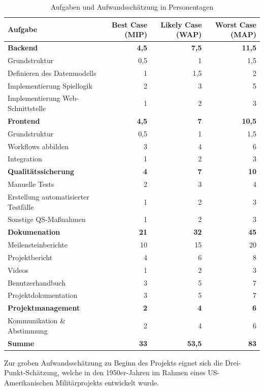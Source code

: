 \documentclass[a4paper,11pt,listof=numbered,glossary=totoc,parskip=half,toc=bib]{scrreprt}
\begin{document}
	\begin{table}
		\centering
		\begin{tabular}{lrrr}
			\toprule
			Aufgabe & Best Case (MIP) & Likely Case (WAP) & Worst Case (MAP) \\
			\midrule
			\textbf{Backend} & \textbf{4,5} & \textbf{7,5} & \textbf{11,5} \\
			Grundstruktur & 0,5 & 1 & 1,5 \\
			Definieren des Datenmodells & 1 & 1,5 & 2 \\
			Implementierung Spiellogik & 2 & 3 & 5 \\
			Implementierung Web-Schnittstelle & 1 & 2 & 3 \\
			\midrule
			\textbf{Frontend} & \textbf{4,5} & \textbf{7} & \textbf{10,5} \\
			Grundstruktur & 0,5 & 1 & 1,5 \\
			Workflows abbilden & 3 & 4 & 6 \\
			Integration & 1 & 2 & 3 \\
			\midrule
			\textbf{Qualitätssicherung} & \textbf{4} & \textbf{7} & \textbf{10} \\
			Manuelle Tests & 2 & 3 & 4 \\
			Erstellung automatisierter Testfälle & 1 & 2 & 3 \\
			Sonstige QS-Maßnahmen & 1 & 2 & 3 \\
			\midrule 
			\textbf{Dokumenation} & \textbf{21} & \textbf{32} & \textbf{45} \\
			Meilensteinberichte & 10 & 15 & 20 \\
			Projektbericht & 4 & 6 & 8 \\
			Videos & 1 & 2 & 3 \\
			Benutzerhandbuch & 3 & 5 & 7 \\
			Projektdokumentation & 3 & 5 & 7 \\
			\midrule
			\textbf{Projektmanagement} & \textbf{2} & \textbf{4} & \textbf{6} \\
			Kommunikation \& Abstimmung & 2 & 4 & 6 \\
			\midrule 
			\Large\bfseries Summe & \Large\bfseries 33 & \Large\bfseries 53,5 & \Large\bfseries 83 \\
			\bottomrule	
				
		\end{tabular}
		\caption{Aufgaben und Aufwandsschätzung in Personentagen}
		\label{tab:aufwand}
	\end{table}
	
	Zur groben Aufwandsschätzung zu Beginn des Projekts eignet sich die Drei-Punkt-Schätzung, welche in den 1950er-Jahren im Rahmen eines US-Amerikanischen Militärprojekts entwickelt
wurde. 
\end{document}
